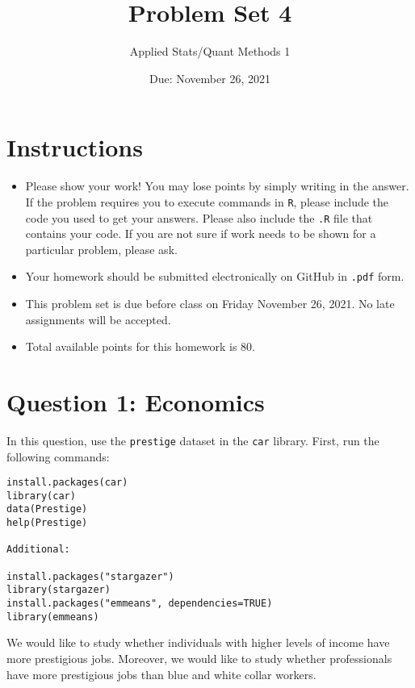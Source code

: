 \documentclass[12pt,letterpaper]{article}
\title{Problem Set 4}
\date{Due: November 26, 2021}
\author{Applied Stats/Quant Methods 1}
\begin{document}
	\maketitle
	\section*{Instructions}
	\begin{itemize}
		\item Please show your work! You may lose points by simply writing in the answer. If the problem requires you to execute commands in \texttt{R}, please include the code you used to get your answers. Please also include the \texttt{.R} file that contains your code. If you are not sure if work needs to be shown for a particular problem, please ask.
		\item Your homework should be submitted electronically on GitHub in \texttt{.pdf} form.
		\item This problem set is due before class on Friday November 26, 2021. No late assignments will be accepted.
		\item Total available points for this homework is 80.
	\end{itemize}



	\vspace{.5cm}
\section*{Question 1: Economics}
\vspace{.25cm}
\noindent 	
In this question, use the \texttt{prestige} dataset in the \texttt{car} library. First, run the following commands:

\begin{verbatim}
install.packages(car)
library(car)
data(Prestige)
help(Prestige)

Additional: 

install.packages("stargazer")
library(stargazer)
install.packages("emmeans", dependencies=TRUE)
library(emmeans)
\end{verbatim} 


\noindent We would like to study whether individuals with higher levels of income have more prestigious jobs. Moreover, we would like to study whether professionals have more prestigious jobs than blue and white collar workers.
\end{document}
